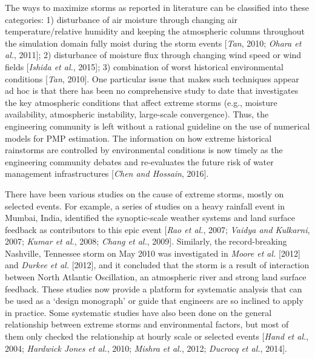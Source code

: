 The ways to maximize storms as reported in literature can be classified into these categories: 1) disturbance of air moisture through changing air temperature/relative humidity and keeping the atmospheric columns throughout the simulation domain fully moist during the storm events [\textit{Tan}, 2010; \textit{Ohara et al.}, 2011]; 2) disturbance of moisture flux through changing wind speed or wind fields [\textit{Ishida et al.}, 2015]; 3) combination of worst historical environmental conditions [\textit{Tan}, 2010]. One particular issue that makes such techniques appear ad hoc is that there has been no comprehensive study to date that investigates the key atmospheric conditions that affect extreme storms (e.g., moisture availability, atmospheric instability, large-scale convergence). Thus, the engineering community is left without a rational guideline on the use of numerical models for PMP estimation. The information on how extreme historical rainstorms are controlled by environmental conditions is now timely as the engineering community debates and re-evaluates the future risk of water management infrastructures [\textit{Chen and Hossain}, 2016].

There have been various studies on the cause of extreme storms, mostly on selected events. For example, a series of studies on a heavy rainfall event in Mumbai, India, identified the synoptic-scale weather systems and land surface feedback as contributors to this epic event [\textit{Rao et al.}, 2007; \textit{Vaidya and Kulkarni}, 2007; \textit{Kumar et al.}, 2008; \textit{Chang et al.}, 2009]. Similarly, the record-breaking Nashville, Tennessee storm on May 2010 was investigated in \textit{Moore et al.} [2012] and \textit{Durkee et al.} [2012], and it concluded that the storm is a result of interaction between North Atlantic Oscillation, an atmospheric river and strong land surface feedback. These studies now provide a platform for systematic analysis that can be used as a ‘design monograph’ or guide that engineers are so inclined to apply in practice. Some systematic studies have also been done on the general relationship between extreme storms and environmental factors, but most of them only checked the relationship at hourly scale or selected events [\textit{Hand et al.}, 2004; \textit{Hardwick Jones et al.}, 2010; \textit{Mishra et al.}, 2012; \textit{Ducrocq et al.}, 2014].


